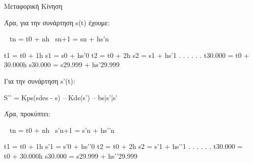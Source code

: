 \documentclass[a4paper]{article}
\begin{document}
        Μεταφορική Κίνηση


        Άρα, για την συνάρτηση s(t) έχουμε:

        ~ tn = t0 + nh					~sn+1 = sn  + hs’n

        t1 = t0  + 1h					   s1    = s0  + hs’­­­0
        t2 = t0  + 2h					   s2    = s1  + hs’1
            .						     .
            .						     .
            .						     .
        t30.000 = t0 + 30.000h			    s30.000 = s29.999 + hs’29.999
            
        Για την συνάρτηση s’(t):

            S’’	= Kps(sdes - s) – Kds(s’) – bs|s’|s’

            Άρα, προκύπτει:

        ~ tn = t0 + nh					~s’n+1 = s’n  + hs’’n

        t1 = t0  + 1h					   s’1    = s’0  + hs’’­­­0
        t2 = t0  + 2h					   s2    = s’1  + hs’’1
            .						     .
            .						     .
            .						     .
        t30.000 = t0 + 30.000h			   s30.000 = s29.999 + hs’’29.999
\end{document}
